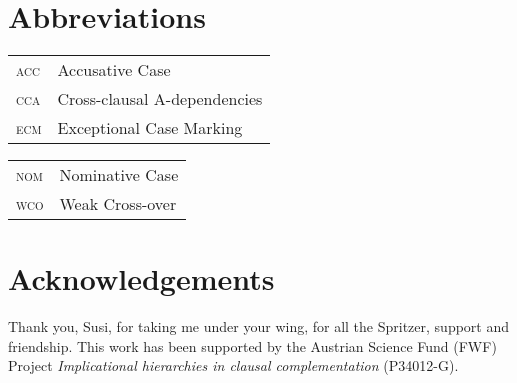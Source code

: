 \documentclass[output=paper,colorlinks,citecolor=brown]{langscibook}
\begin{document}
\section*{Abbreviations}
\begin{tabularx}{.5\textwidth}{lQ}
\textsc{acc} & Accusative Case              \\
\textsc{cca} & Cross-clausal A-dependencies\\
\textsc{ecm} & Exceptional Case Marking   \\    
\end{tabularx}
\begin{tabularx}{.5\textwidth}{lQ}
 \textsc{nom} & Nominative Case \\
\textsc{wco} & Weak Cross-over \\
\end{tabularx}



\section*{Acknowledgements}
Thank you, Susi, for taking me under your wing, for all the Spritzer, support and friendship.
This work has been supported by the Austrian Science Fund (FWF) Project \textit{Implicational hierarchies in clausal complementation} (P34012-G).



\printbibliography[heading=subbibliography,notkeyword=this]
\end{document}
